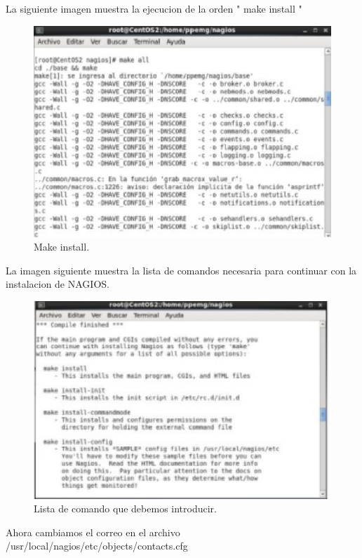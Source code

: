 La siguiente imagen muestra la ejecucion de la orden " make install "
\begin{figure}[H]
\begin{center}
\includegraphics[scale=0.6]{imagenes/opcional2-1.eps}
\caption{Make install.}
\end{center}
\end{figure}

La imagen siguiente muestra la lista de comandos necesaria para continuar con la instalacion de NAGIOS.

\begin{figure}[H]
\begin{center}
\includegraphics[scale=0.6]{imagenes/opcional2-2.eps}
\caption{Lista de comando que debemos introducir.}
\end{center}
\end{figure}
Ahora cambiamos el correo en el archivo /usr/local/nagios/etc/objects/contacts.cfg

